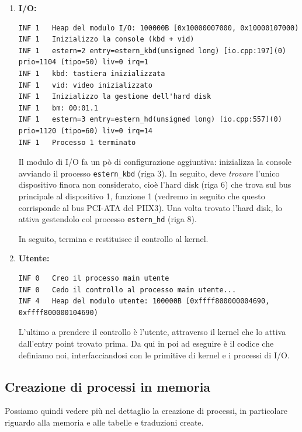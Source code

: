 \documentclass[a4paper,11pt]{article}
\begin{document}
\begin{enumerate}
\item \textbf{I/O:}
\begin{lstlisting}[language={}, style=codestyle]	
INF	1	Heap del modulo I/O: 100000B [0x10000007000, 0x10000107000)
INF	1	Inizializzo la console (kbd + vid)
INF	1	estern=2 entry=estern_kbd(unsigned long) [io.cpp:197](0) prio=1104 (tipo=50) liv=0 irq=1
INF	1	kbd: tastiera inizializzata
INF	1	vid: video inizializzato
INF	1	Inizializzo la gestione dell'hard disk
INF	1	bm: 00:01.1
INF	1	estern=3 entry=estern_hd(unsigned long) [io.cpp:557](0) prio=1120 (tipo=60) liv=0 irq=14
INF	1	Processo 1 terminato
\end{lstlisting}

Il modulo di I/O fa un pò di configurazione aggiuntiva: inizializza la console avviando il processo \lstinline|estern_kbd| (riga 3).
In seguito, deve \textit{trovare} l'unico dispositivo finora non considerato, cioè l'hard disk (riga 6) che trova sul bus principale al dispositivo 1, funzione 1 (vedremo in seguito che questo corrisponde al bus PCI-ATA del PIIX3).
Una volta trovato l'hard disk, lo attiva gestendolo col processo \lstinline|estern_hd| (riga 8).

In seguito, termina e restituisce il controllo al kernel.

\item \textbf{Utente:}
\begin{lstlisting}[language={}, style=codestyle]	
INF	0	Creo il processo main utente
INF	0	Cedo il controllo al processo main utente...
INF	4	Heap del modulo utente: 100000B [0xffff800000004690, 0xffff800000104690)
\end{lstlisting}

L'ultimo a prendere il controllo è l'utente, attraverso il kernel che lo attiva dall'entry point trovato prima.
Da qui in poi ad eseguire è il codice che definiamo noi, interfacciandosi con le primitive di kernel e i processi di I/O.

\end{enumerate}

\subsection{Creazione di processi in memoria}
Possiamo quindi vedere più nel dettaglio la creazione di processi, in particolare riguardo alla memoria e alle tabelle e traduzioni create.
\end{document}
